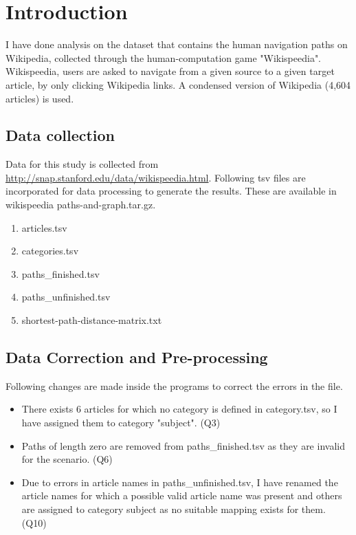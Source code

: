 \documentclass[12pt]{article}
\begin{document}
	\section{Introduction} %
	
	I have done analysis on the dataset that contains the human navigation paths on Wikipedia, collected through the human-computation game "Wikispeedia". Wikispeedia, users are asked to navigate from a given source to a given target article, by only clicking Wikipedia links. A condensed version of Wikipedia (4,604 articles) is used.  
	
	\subsection{Data collection}
	
	Data for this study is collected from \url{http://snap.stanford.edu/data/wikispeedia.html}. Following tsv files are incorporated for data processing to generate the results. These are available in wikispeedia paths-and-graph.tar.gz. 
	\begin{enumerate}
	    \item articles.tsv
	    \item categories.tsv
	    \item paths\_finished.tsv
	    \item paths\_unfinished.tsv
	    \item shortest-path-distance-matrix.txt
	\end{enumerate}
	
	\subsection{Data Correction and Pre-processing}
	Following changes are made inside the programs to correct the errors in the file.
	\begin{itemize}
		\item There exists 6 articles for which no category is defined in category.tsv, so I have assigned them to category "subject". (Q3)
		\item Paths of length zero are removed from paths\_finished.tsv as they are invalid for the scenario. (Q6)
	    \item Due to errors in article names in  paths\_unfinished.tsv, I have renamed the article names for which a possible valid article name was present and others are assigned to category subject as no suitable mapping exists for them. (Q10)
	    
	  
	\end{itemize}
	
\end{document}
